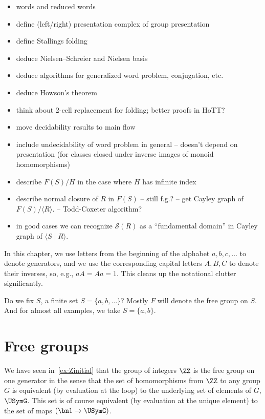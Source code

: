 \begin{itemize}
\item words and reduced words
\item define (left/right) presentation complex of group presentation
\item define Stallings folding
\item deduce Nielsen--Schreier and Nielsen basis
\item deduce algorithms for generalized word problem, conjugation, etc.
\item deduce Howson's theorem
\item think about 2-cell replacement for folding; better proofs in HoTT?
\item move decidability results to main flow
\item include undecidability of word problem in general
  -- doesn't depend on presentation (for classes closed under inverse images of monoid homomorphisms)
\item describe $F(S)/H$ in the case where $H$ has infinite index
\item describe normal closure of $R$ in $F(S)$ -- still f.g.? -- get Cayley graph of $F(S)/\langle R\rangle$. -- Todd-Coxeter algorithm?
\item in good cases we can recognize $\mathcal{S}(R)$ as a ``fundamental domain'' in Cayley graph of $\langle S\mid R\rangle$.
\end{itemize}

\begin{remark}
  In this chapter, we use letters from the
  beginning of the alphabet $a,b,c,\dots$
  to denote generators,
  and we use the corresponding capital letters
  $A,B,C$ to denote their inverses,
  so, e.g., $aA=Aa=1$.
  This cleans up the notational clutter significantly.
\end{remark}

Do we fix $S$, a finite set $S=\{a,b,\ldots\}$?
Mostly $F$ will denote the free group on $S$.
And for almost all examples, we take $S = \{a,b\}$.

\section{Free groups}
\label{sec:freegroups}

We have seen in~\cref{ex:Zinitial} that the group of integers $\ZZ$
is the free group on one generator in the sense that the set of homomorphisms
from $\ZZ$ to any group $G$ is equivalent (by evaluation at the loop)
to the underlying set of elements of $G$, $\USymG$.
This set is of course equivalent (by evaluation at the unique element)
to the set of maps $(\bn 1 \to \USymG)$.

